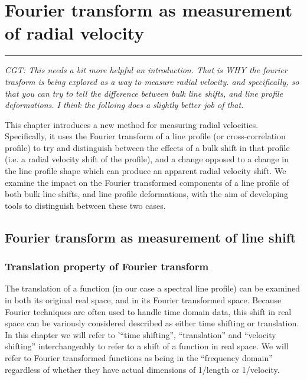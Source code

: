 \chapter{Fourier transform as measurement of radial velocity}
\label{\thechapter}
\label{ch:Methods}


\rule{\textwidth}{1.6pt}
\minitoc
\clearpage


{\em CGT: This needs a bit more helpful an introduction. That is WHY the fourier trasform is being explored as
a way to measure radial velocity. and specifically, so that you can try to tell the difference between bulk line shifts, and line profile deformations.
I think the folloing does a slightly better job of that.}

This chapter introduces a new method for measuring radial velocities. Specifically, it uses the Fourier transform
of a line profile (or cross-correlation profile) to try and distinguish between the effects of a bulk shift in that profile
(i.e. a radial velocity shift of the profile), and a change opposed to a change in the line profile shape which can produce an
apparent radial velocity shift. We examine the impact on the Fourier transformed components of a line profile of both bulk line shifts,
and line profile deformations, with the aim of developing tools to distinguish between these two cases.



\section{Fourier transform as measurement of line shift}
\label{\thesection}
\label{ch:FT_line_shift}


\subsection{Translation property of Fourier transform}

The translation of a function (in our case a spectral line profile) can be examined in both its original real
space, and in its Fourier transformed space. Because Fourier techniques are often used to handle time domain data,
this shift in real space can be variously considered described as either time shifting or translation. In this chapter 
we will refer to '``time shifting'', ``translation'' and ``velocity shifting'' interchangeably to refer to a shift of a function
in real space. We will refer to Fourier transformed functions as being in the ``frequency domain'' regardless of whether they have
actual dimensions of 1/length or 1/velocity.

